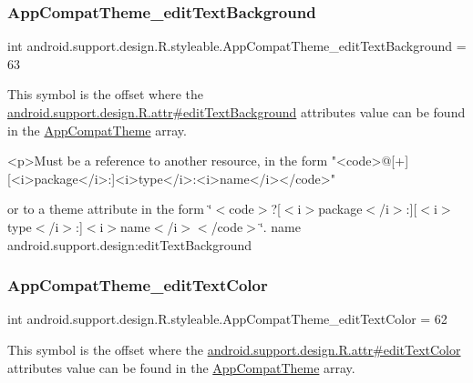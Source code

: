\subsubsection{\texorpdfstring{App\+Compat\+Theme\+\_\+edit\+Text\+Background}{AppCompatTheme\_editTextBackground}}
{\footnotesize\ttfamily int android.\+support.\+design.\+R.\+styleable.\+App\+Compat\+Theme\+\_\+edit\+Text\+Background = 63\hspace{0.3cm}{\ttfamily [static]}}

This symbol is the offset where the \hyperlink{classandroid_1_1support_1_1design_1_1R_1_1attr_a49b2c6643751648743fe12e507b2f5e8}{android.\+support.\+design.\+R.\+attr\#edit\+Text\+Background} attribute\textquotesingle{}s value can be found in the \hyperlink{classandroid_1_1support_1_1design_1_1R_1_1styleable_afb351dc8de20cbd4c89abe360373010c}{App\+Compat\+Theme} array.

\begin{DoxyVerb}      <p>Must be a reference to another resource, in the form "<code>@[+][<i>package</i>:]<i>type</i>:<i>name</i></code>"
\end{DoxyVerb}
 or to a theme attribute in the form \char`\"{}$<$code$>$?\mbox{[}$<$i$>$package$<$/i$>$\+:\mbox{]}\mbox{[}$<$i$>$type$<$/i$>$\+:\mbox{]}$<$i$>$name$<$/i$>$$<$/code$>$\char`\"{}.  name android.\+support.\+design\+:edit\+Text\+Background \mbox{\label{classandroid_1_1support_1_1design_1_1R_1_1styleable_af735eb4a960975c07d0f92771af6d22c}} 
\subsubsection{\texorpdfstring{App\+Compat\+Theme\+\_\+edit\+Text\+Color}{AppCompatTheme\_editTextColor}}
{\footnotesize\ttfamily int android.\+support.\+design.\+R.\+styleable.\+App\+Compat\+Theme\+\_\+edit\+Text\+Color = 62\hspace{0.3cm}{\ttfamily [static]}}

This symbol is the offset where the \hyperlink{classandroid_1_1support_1_1design_1_1R_1_1attr_a7a57b92b07f0f87e82599b0e12477273}{android.\+support.\+design.\+R.\+attr\#edit\+Text\+Color} attribute\textquotesingle{}s value can be found in the \hyperlink{classandroid_1_1support_1_1design_1_1R_1_1styleable_afb351dc8de20cbd4c89abe360373010c}{App\+Compat\+Theme} array.

